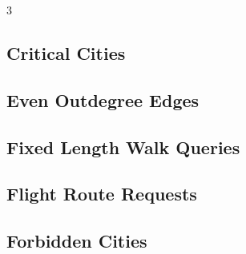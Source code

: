 \documentclass[8pt]{extarticle}
\begin{document}
\begin{multicols*}{3}
\subsection{Critical Cities}
\begin{caixaenunciado}

\end{caixaenunciado}
\vspace{0.3cm}


\subsection{Even Outdegree Edges}
\begin{caixaenunciado}

\end{caixaenunciado}
\vspace{0.3cm}


\subsection{Fixed Length Walk Queries}
\begin{caixaenunciado}

\end{caixaenunciado}
\vspace{0.3cm}


\subsection{Flight Route Requests}
\begin{caixaenunciado}

\end{caixaenunciado}
\vspace{0.3cm}


\subsection{Forbidden Cities}
\begin{caixaenunciado}

\end{caixaenunciado}
\vspace{0.3cm}



\end{multicols*}
\end{document}

